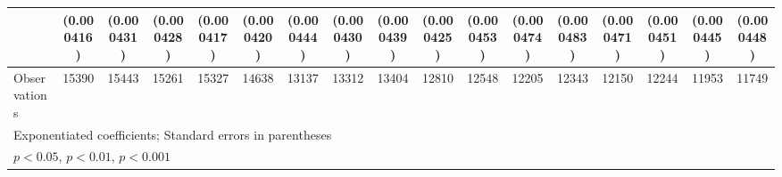 {\begin{tabular}{l*{16}{c}}
                    &  (0.000416)         &  (0.000431)         &  (0.000428)         &  (0.000417)         &  (0.000420)         &  (0.000444)         &  (0.000430)         &  (0.000439)         &  (0.000425)         &  (0.000453)         &  (0.000474)         &  (0.000483)         &  (0.000471)         &  (0.000451)         &  (0.000445)         &  (0.000448)         \\
\hline
Observations        &       15390         &       15443         &       15261         &       15327         &       14638         &       13137         &       13312         &       13404         &       12810         &       12548         &       12205         &       12343         &       12150         &       12244         &       11953         &       11749         \\
\hline\hline
\multicolumn{17}{l}{\footnotesize Exponentiated coefficients; Standard errors in parentheses}\\
\multicolumn{17}{l}{\footnotesize \sym{*} \(p<0.05\), \sym{**} \(p<0.01\), \sym{***} \(p<0.001\)}\\
\end{tabular}
}
